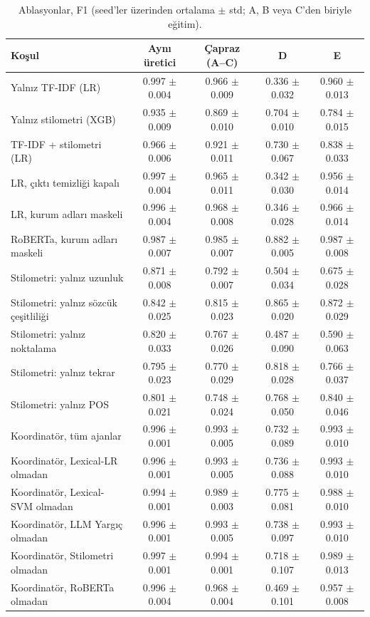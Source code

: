 \begin{table}[t]
\centering
\footnotesize
\caption{Ablasyonlar, F1 (seed'ler üzerinden ortalama $\pm$ std; A, B veya C'den biriyle eğitim).}
\label{tab:ablation}
\begin{tabular}{lcccc}
\toprule
Koşul & Aynı üretici & Çapraz (A--C) & D & E \\
\midrule
Yalnız TF-IDF (LR) & 0.997 $\pm$ 0.004 & 0.966 $\pm$ 0.009 & 0.336 $\pm$ 0.032 & 0.960 $\pm$ 0.013 \\
Yalnız stilometri (XGB) & 0.935 $\pm$ 0.009 & 0.869 $\pm$ 0.010 & 0.704 $\pm$ 0.010 & 0.784 $\pm$ 0.015 \\
TF-IDF + stilometri (LR) & 0.966 $\pm$ 0.006 & 0.921 $\pm$ 0.011 & 0.730 $\pm$ 0.067 & 0.838 $\pm$ 0.033 \\
LR, çıktı temizliği kapalı & 0.997 $\pm$ 0.004 & 0.965 $\pm$ 0.011 & 0.342 $\pm$ 0.030 & 0.956 $\pm$ 0.014 \\
LR, kurum adları maskeli & 0.996 $\pm$ 0.004 & 0.968 $\pm$ 0.008 & 0.346 $\pm$ 0.028 & 0.966 $\pm$ 0.014 \\
RoBERTa, kurum adları maskeli & 0.987 $\pm$ 0.007 & 0.985 $\pm$ 0.007 & 0.882 $\pm$ 0.005 & 0.987 $\pm$ 0.008 \\
Stilometri: yalnız uzunluk & 0.871 $\pm$ 0.008 & 0.792 $\pm$ 0.007 & 0.504 $\pm$ 0.034 & 0.675 $\pm$ 0.028 \\
Stilometri: yalnız sözcük çeşitliliği & 0.842 $\pm$ 0.025 & 0.815 $\pm$ 0.023 & 0.865 $\pm$ 0.020 & 0.872 $\pm$ 0.029 \\
Stilometri: yalnız noktalama & 0.820 $\pm$ 0.033 & 0.767 $\pm$ 0.026 & 0.487 $\pm$ 0.090 & 0.590 $\pm$ 0.063 \\
Stilometri: yalnız tekrar & 0.795 $\pm$ 0.023 & 0.770 $\pm$ 0.029 & 0.818 $\pm$ 0.028 & 0.766 $\pm$ 0.037 \\
Stilometri: yalnız POS & 0.801 $\pm$ 0.021 & 0.748 $\pm$ 0.024 & 0.768 $\pm$ 0.050 & 0.840 $\pm$ 0.046 \\
Koordinatör, tüm ajanlar & 0.996 $\pm$ 0.001 & 0.993 $\pm$ 0.005 & 0.732 $\pm$ 0.089 & 0.993 $\pm$ 0.010 \\
Koordinatör, Lexical-LR olmadan & 0.996 $\pm$ 0.001 & 0.993 $\pm$ 0.005 & 0.736 $\pm$ 0.088 & 0.993 $\pm$ 0.010 \\
Koordinatör, Lexical-SVM olmadan & 0.994 $\pm$ 0.001 & 0.989 $\pm$ 0.003 & 0.775 $\pm$ 0.081 & 0.988 $\pm$ 0.010 \\
Koordinatör, LLM Yargıç olmadan & 0.996 $\pm$ 0.001 & 0.993 $\pm$ 0.005 & 0.738 $\pm$ 0.097 & 0.993 $\pm$ 0.010 \\
Koordinatör, Stilometri olmadan & 0.997 $\pm$ 0.001 & 0.994 $\pm$ 0.001 & 0.718 $\pm$ 0.107 & 0.989 $\pm$ 0.013 \\
Koordinatör, RoBERTa olmadan & 0.996 $\pm$ 0.004 & 0.968 $\pm$ 0.004 & 0.469 $\pm$ 0.101 & 0.957 $\pm$ 0.008 \\
\bottomrule
\end{tabular}
\end{table}
